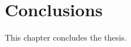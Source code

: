 \chapter{Conclusions}
\label{chapter:conclusion}

\begin{ChapAbstract}
    This chapter concludes the thesis.
\end{ChapAbstract}


